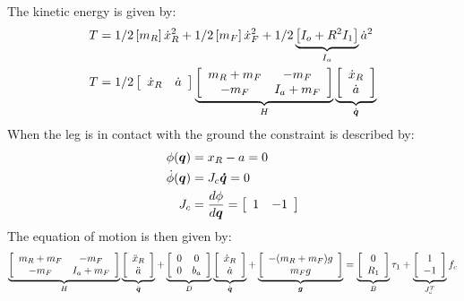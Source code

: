 The kinetic energy is given by:
%
\begin{align}
T &= 1/2 \left[ m_R \right] \dot{x}_R^2 + 1/2 \left[ m_F \right] \dot{x}_F^2 + 1/2 \underbrace{\left[ I_o + R^2 I_1 \right]}_{I_a} \dot{a}^2 \\
T &= 1/2 
\left[ \begin{array}{c c}
\dot{x}_R & \dot{a}
\end{array} \right] 
\underbrace{
\left[ \begin{array}{c c}
m_R + m_F & -m_F \\
-m_F      & I_a + m_F
\end{array} \right] }_{H}
\underbrace{
\left[ \begin{array}{c}
\dot{x}_R \\ \dot{a}
\end{array} \right] }_{\dot{\vec{q}}}
\end{align}
%
When the leg is in contact with the ground the constraint is described by:
%
\begin{align}
\phi( \vec{q} )       &= x_R - a = 0 \\
\dot{\phi}( \vec{q} ) &= J_c\vec{\dot{q}}  = 0 \\
J_c                   &= \frac{d \phi}{d\vec{q}} = \left[ \begin{array}{c c} 1 & -1 \end{array} \right]
\label{eq:dsdm_impact_const}
\end{align}
%
The equation of motion is then given by:
%
\begin{align} 
\underbrace{
\left[ \begin{array}{c c}
\scriptsize m_R + m_F & -m_F \\
\scriptsize -m_F      & I_a + m_F
\end{array} \right] }_{H}
\underbrace{
\left[ \begin{array}{c}
\ddot{x}_R \\ \ddot{a}
\end{array} \right] }_{\ddot{\vec{q}}}
+
\underbrace{
\left[ \begin{array}{c c}
0      & 0 \\
0      & b_a 
\end{array} \right] }_{D}
\underbrace{
\left[ \begin{array}{c}
\dot{x}_R \\ \dot{a}
\end{array} \right] }_{\dot{\vec{q}}}
+
\underbrace{
\left[ \begin{array}{c}
-(m_R+m_F)g \\ m_F g 
\end{array} \right] }_{\vec{g}}
=
\underbrace{
\left[ \begin{array}{c}
0 \\ R_1
\end{array} \right] }_{B}
\tau_1
+
\underbrace{
\left[ \begin{array}{c}
1 \\ -1
\end{array} \right] }_{J_c^T}
f_c
\end{align}
